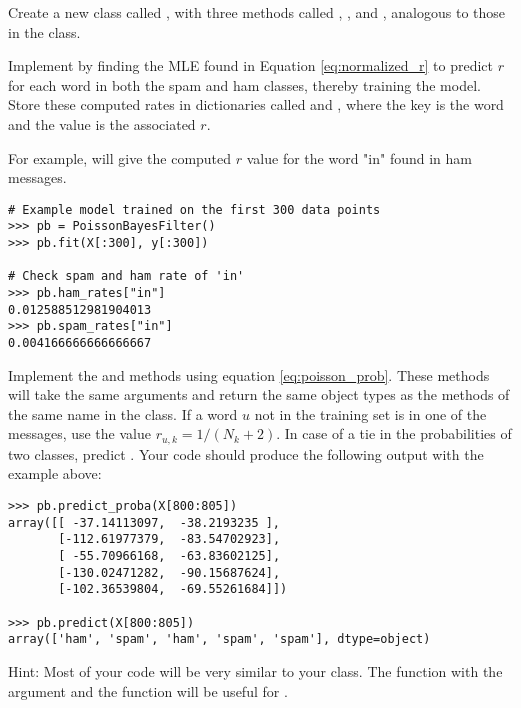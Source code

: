 \begin{problem}
Create a new class called , with three methods called , , and , analogous to those in the  class.

Implement  by finding the MLE found in Equation \ref{eq:normalized_r} to predict $r$ for each word in both the spam and ham classes, thereby training the model.
Store these computed rates in dictionaries called  and , where the key is the word and the value is the associated $r$.

For example,  will give the computed $r$ value for the word "in" found in ham messages.
\begin{lstlisting}
# Example model trained on the first 300 data points
>>> pb = PoissonBayesFilter()
>>> pb.fit(X[:300], y[:300])

# Check spam and ham rate of 'in'
>>> pb.ham_rates["in"]
0.012588512981904013
>>> pb.spam_rates["in"]
0.004166666666666667
\end{lstlisting}

Implement the  and  methods using equation \ref{eq:poisson_prob}.
These methods will take the same arguments and return the same object types as the methods of the same name in the  class.
If a word $u$ not in the training set is in one of the messages, use the value $r_{u,k}=1/(N_{k}+2)$.
In case of a tie in the probabilities of two classes, predict .
Your code should produce the following output with the example above:
\begin{lstlisting}
>>> pb.predict_proba(X[800:805])
array([[ -37.14113097,  -38.2193235 ],
       [-112.61977379,  -83.54702923],
       [ -55.70966168,  -63.83602125],
       [-130.02471282,  -90.15687624],
       [-102.36539804,  -69.55261684]])

>>> pb.predict(X[800:805])
array(['ham', 'spam', 'ham', 'spam', 'spam'], dtype=object)
\end{lstlisting}

Hint: Most of your code will be very similar to your  class. The function  with the argument  and the function  will be useful for .
\end{problem}

